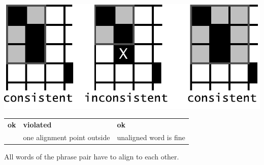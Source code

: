 \documentclass[landscape]{slides}
\begin{document}

\vspace{5mm}
\begin{center}
\includegraphics[scale=1]{consistent-with-unaligned-bw.pdf}

\begin{tabular}{CCC}
\bf ok & \bf violated & \bf ok \\
& one alignment point outside
& unaligned word is fine\\
\end{tabular}

\vspace{15mm}
All words of the phrase pair have to align to each other.
\end{center}


\end{document}
